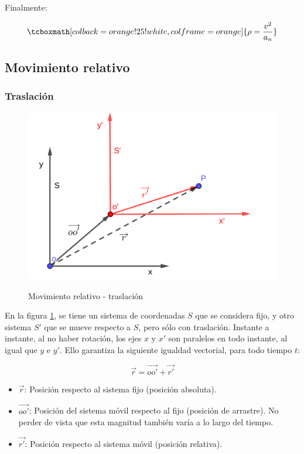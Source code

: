 \documentclass{article}
\begin{document}
Finalmente:

\begin{equation}
\tcboxmath[colback=orange!25!white,colframe=orange]{
\rho = \frac{v^2}{a_n}
}
\end{equation}

\subsection{Movimiento relativo}

\subsubsection{Traslación}

\begin{figure}[ht]
\centering
\caption{Movimiento relativo - traslación}
\includegraphics[scale=1.3]{../../common/img/62.01/theory/03-kinematics-rel-mov-tra.png}
\label{fig:relMovTra}
\end{figure}

En la figura \ref{fig:relMovTra}, se tiene un sistema de coordenadas $S$ que se considera fijo, y otro sistema $S'$ que se mueve respecto a $S$, pero sólo con traslación. Instante a instante, al no haber rotación, los ejes $x$ y $x'$ son paralelos en todo instante, al igual que $y$ e $y'$. Ello garantiza la siguiente igualdad vectorial, para todo tiempo $t$:

\begin{equation}
\overrightarrow{r} = \overrightarrow{oo'} + \overrightarrow{r'}
\end{equation}

\begin{itemize}
\item $\overrightarrow{r}$: Posición respecto al sistema fijo (posición absoluta).
\item $\overrightarrow{oo'}$: Posición del sistema móvil respecto al fijo (posición de arrastre). No perder de vista que esta magnitud también varía a lo largo del tiempo.
\item $\overrightarrow{r'}$: Posición respecto al sistema móvil (posición relativa).
\end{itemize}
\end{document}

